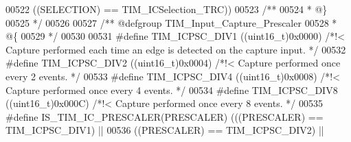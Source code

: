 \begin{DoxyCode}
00522                                         \textcolor{preprocessor}{(}\textcolor{preprocessor}{(}\textcolor{preprocessor}{SELECTION}\textcolor{preprocessor}{)} \textcolor{preprocessor}{==} TIM_ICSelection_TRC\textcolor{preprocessor}{)}\textcolor{preprocessor}{)}
00523 \textcolor{comment}{/**}
00524 \textcolor{comment}{  * @\}}
00525 \textcolor{comment}{  */}
00526 
00527 \textcolor{comment}{/** @defgroup TIM\_Input\_Capture\_Prescaler }
00528 \textcolor{comment}{  * @\{}
00529 \textcolor{comment}{  */}
00530 
00531 \textcolor{preprocessor}{#}\textcolor{preprocessor}{define} \textcolor{preprocessor}{TIM\_ICPSC\_DIV1}                     \textcolor{preprocessor}{(}\textcolor{preprocessor}{(}\textcolor{preprocessor}{uint16\_t}\textcolor{preprocessor}{)}0x0000\textcolor{preprocessor}{)} \textcolor{comment}{/*!< Capture performed each time an edge
       is detected on the capture input. */}
00532 \textcolor{preprocessor}{#}\textcolor{preprocessor}{define} \textcolor{preprocessor}{TIM\_ICPSC\_DIV2}                     \textcolor{preprocessor}{(}\textcolor{preprocessor}{(}\textcolor{preprocessor}{uint16\_t}\textcolor{preprocessor}{)}0x0004\textcolor{preprocessor}{)} \textcolor{comment}{/*!< Capture performed once every 2
       events. */}
00533 \textcolor{preprocessor}{#}\textcolor{preprocessor}{define} \textcolor{preprocessor}{TIM\_ICPSC\_DIV4}                     \textcolor{preprocessor}{(}\textcolor{preprocessor}{(}\textcolor{preprocessor}{uint16\_t}\textcolor{preprocessor}{)}0x0008\textcolor{preprocessor}{)} \textcolor{comment}{/*!< Capture performed once every 4
       events. */}
00534 \textcolor{preprocessor}{#}\textcolor{preprocessor}{define} \textcolor{preprocessor}{TIM\_ICPSC\_DIV8}                     \textcolor{preprocessor}{(}\textcolor{preprocessor}{(}\textcolor{preprocessor}{uint16\_t}\textcolor{preprocessor}{)}0x000C\textcolor{preprocessor}{)} \textcolor{comment}{/*!< Capture performed once every 8
       events. */}
00535 \textcolor{preprocessor}{#}\textcolor{preprocessor}{define} \textcolor{preprocessor}{IS\_TIM\_IC\_PRESCALER}\textcolor{preprocessor}{(}\textcolor{preprocessor}{PRESCALER}\textcolor{preprocessor}{)} \textcolor{preprocessor}{(}\textcolor{preprocessor}{(}\textcolor{preprocessor}{(}\textcolor{preprocessor}{PRESCALER}\textcolor{preprocessor}{)} \textcolor{preprocessor}{==} TIM_ICPSC_DIV1\textcolor{preprocessor}{)} \textcolor{preprocessor}{||}
00536                                         \textcolor{preprocessor}{(}\textcolor{preprocessor}{(}\textcolor{preprocessor}{PRESCALER}\textcolor{preprocessor}{)} \textcolor{preprocessor}{==} TIM_ICPSC_DIV2\textcolor{preprocessor}{)} \textcolor{preprocessor}{||}

\end{DoxyCode}
